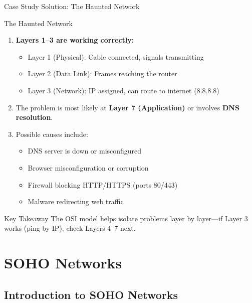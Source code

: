 \documentclass[aspectratio=169]{beamer}  %
\begin{document}
\begin{frame}{Case Study Solution: The Haunted Network}
    \begin{casesolution}{The Haunted Network}
        \begin{enumerate}
            \item \textbf{Layers 1--3 are working correctly:}
                \begin{itemize}
                    \item Layer 1 (Physical): Cable connected, signals transmitting
                    \item Layer 2 (Data Link): Frames reaching the router
                    \item Layer 3 (Network): IP assigned, can route to internet (8.8.8.8)
                \end{itemize}
            \item The problem is most likely at \textbf{Layer 7 (Application)} or involves \textbf{DNS resolution}.
            \item Possible causes include:
                \begin{itemize}
                    \item DNS server is down or misconfigured
                    \item Browser misconfiguration or corruption
                    \item Firewall blocking HTTP/HTTPS (ports 80/443)
                    \item Malware redirecting web traffic
                \end{itemize}
        \end{enumerate}
    \end{casesolution}
    
    \begin{alertblock}{Key Takeaway}
        The OSI model helps isolate problems layer by layer---if Layer 3 works (ping by IP), check Layers 4--7 next.
    \end{alertblock}
\end{frame}

\section{SOHO Networks}
\subsection{Introduction to SOHO Networks}
\end{document}
